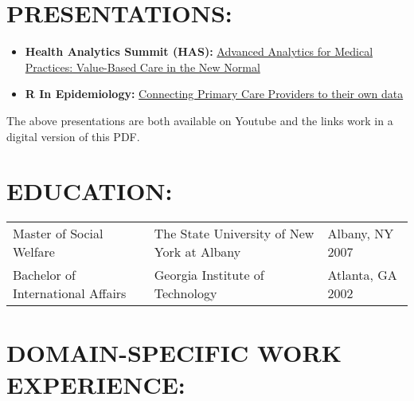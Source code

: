 \documentclass[line, mm, 10pt]{res}
\begin{document}
\begin{resume}




  \section{PRESENTATIONS:}
  \begin{itemize}
    \item {\bf Health Analytics Summit (HAS):} {\href{https://www.youtube.com/watch?v=--vqwbJucPs}{Advanced Analytics for Medical Practices: Value-Based Care in the New Normal}}
    \item {\bf R In Epidemiology:} {\href{https://www.youtube.com/watch?v=-zhTXiiCj58}{Connecting Primary Care Providers to their own data}}
    \end{itemize}

    The above presentations are both available on Youtube and the
    links work in a digital version of this PDF.
  
  
  
  \section{EDUCATION:}
  \begin{tabular} {p{2.25in} p{2.75in} p{2in}}
    Master of Social Welfare & The State University of New York at Albany & Albany, NY 2007 \\
    Bachelor of International Affairs & Georgia Institute of Technology & Atlanta, GA 2002 \\
  \end{tabular}

  \section{DOMAIN-SPECIFIC WORK EXPERIENCE:}


\end{resume}
\end{document}
